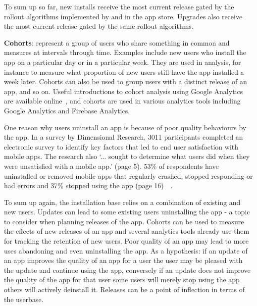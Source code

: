 To sum up so far, new installs receive the most current release gated by the rollout algorithms implemented by and in the app store. Upgrades also receive the most current release gated by the same rollout algorithms.

\textbf{Cohorts}: represent a group of users who share something in common and measures at intervals through time. Examples include new users who install the app on a particular day or in a particular week. They are used in analysis, for instance to measure what proportion of new users still have the app installed a week later. Cohorts can also be used to group users with a distinct release of an app, and so on. Useful introductions to cohort analysis using Google Analytics are available online~, and cohorts are used in various analytics tools including Google Analytics and Firebase Analytics. 


One reason why users uninstall an app is because of poor quality behaviours by the app. In a survey by Dimensional Research, 3011 participants completed an electronic survey to identify key factors that led to end user satisfaction with mobile apps. The research also `... sought to determine what users did when they were unsatisfied with a mobile app.' (page 5). 
53\% of respondents have uninstalled or removed mobile apps that regularly crashed, stopped responding or had errors and 37\% stopped using the app (page 16)~~.

To sum up again, the installation base relies on a combination of existing and new users. Updates can lead to some existing users uninstalling the app - a topic to consider when planning releases of the app. Cohorts can be used to measure the effects of new releases of an app and several analytics tools already use them for tracking the retention of new users. Poor quality of an app may lead to more uses abandoning and even uninstalling the app. As a hypothesis: if an update of an app improves the quality of an app for a user the user may be pleased with the update and continue using the app, conversely if an update does not improve the quality of the app for that user some users will merely stop using the app others will actively deinstall it. Releases can be a point of inflection in terms of the userbase.

